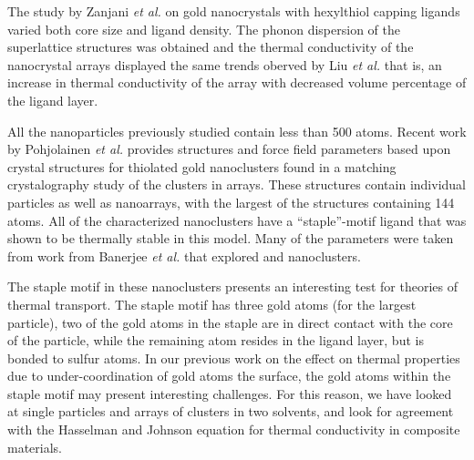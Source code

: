The study by Zanjani \textit{et al.} on gold nanocrystals with hexylthiol capping ligands varied both core size and ligand density.\cite{Zanjani2014}
The phonon dispersion of the superlattice structures was obtained and the thermal conductivity of the nanocrystal arrays displayed the same trends oberved by Liu \textit{et al.} that is, an increase in thermal conductivity of the array with decreased volume percentage of the ligand layer.\cite{Liu2015} 

All the nanoparticles previously studied contain less than 500 atoms. Recent work by Pohjolainen \textit{et al.} provides structures and force field parameters based upon crystal structures for thiolated gold nanoclusters found in a matching crystalography study of the clusters in arrays.\cite{Pohjolainen2016} 
These structures contain individual particles as well as nanoarrays, with the largest of the structures containing 144  atoms. All of the characterized nanoclusters have a ``staple''-motif ligand that was shown to be thermally stable in this model. Many of the parameters were taken from work from Banerjee \textit{et al.} that explored  and  nanoclusters.

The staple motif in these nanoclusters presents an interesting test for theories of thermal transport. 
The staple motif has three gold atoms (for the largest particle), two of the gold atoms in the staple are in direct contact with the core of the particle, while the remaining atom resides in the ligand layer, but is bonded to sulfur atoms. In our previous work on the effect on thermal properties due to under-coordination of gold atoms the surface,\cite{Neidhart2017} the gold atoms within the staple motif may present interesting challenges. 
For this reason, we have looked at single particles and arrays of  clusters in two solvents, and look for agreement with the Hasselman and Johnson equation for thermal conductivity in composite materials.\cite{Hasselman}
